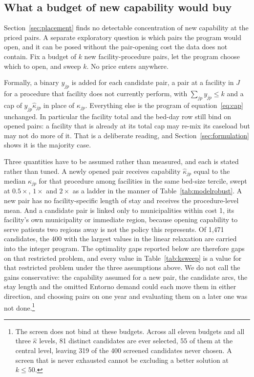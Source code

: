 \subsection{What a budget of new capability would buy}
\label{sec:ksweep}

Section~\ref{sec:placement} finds no detectable concentration of new capability at the priced pairs. A separate exploratory question is which pairs the program would open, and it can be posed without the pair-opening cost the data does not contain. Fix a budget of
$k$ new facility-procedure pairs, let the program choose which to open, and sweep
$k$. No price enters anywhere.

Formally, a binary $y_{jp}$ is added for each candidate pair, a pair at a facility
in $J$ for a procedure that facility does not currently perform, with
$\sum_{jp} y_{jp} \leq k$ and a cap of $y_{jp}\hat{\kappa}_{jp}$ in place of
$\kappa_{jp}$. Everything else is the program of equation~\eqref{eq:cap}
unchanged. In particular the facility total and the bed-day row still bind on
opened pairs: a facility that is already at its total cap may re-mix its caseload
but may not do more of it. That is a deliberate reading, and
Section~\ref{sec:formulation} shows it is the majority case.

Three quantities have to be assumed rather than measured, and each is stated
rather than tuned. A newly opened pair receives capability $\hat{\kappa}_{jp}$
equal to the median $\kappa_{jp}$ for that procedure among facilities in the same
bed-size tercile, swept at $0.5\times$, $1\times$ and $2\times$ as a ladder in the
manner of Table~\ref{tab:modelrobust}. A new pair has no facility-specific length
of stay and receives the procedure-level mean. And a candidate pair is linked only
to municipalities within cost 1, its facility's own municipality or immediate
region, because opening capability to serve patients two regions away is not the
policy this represents. Of 1{,}471 candidates, the 400 with the largest values in
the linear relaxation are carried into the integer program. The optimality gaps
reported below are therefore gaps on that restricted problem, and every value in
Table~\ref{tab:ksweep} is a value for that restricted problem under the three assumptions above. We
do not call the gains conservative: the capability assumed for a new pair, the candidate arcs, the stay length and the omitted
Entorno demand could each move them in either direction, and choosing pairs on one year and evaluating them on a later one
was not done.\footnote{The screen does not bind at these budgets. Across all
eleven budgets and all three $\hat{\kappa}$ levels, 81 distinct candidates are
ever selected, 55 of them at the central level, leaving 319 of the 400 screened
candidates never chosen. A screen that is never exhausted cannot be excluding a
better solution at $k \leq 50$.}


